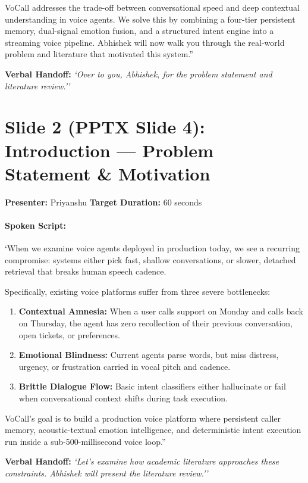 \documentclass[11pt,a4paper]{article}
\begin{document}
VoCall addresses the trade-off between conversational speed and deep contextual understanding in voice agents. We solve this by combining a four-tier persistent memory, dual-signal emotion fusion, and a structured intent engine into a streaming voice pipeline. Abhishek will now walk you through the real-world problem and literature that motivated this system.''

\noindent\textbf{Verbal Handoff:} \textit{`Over to you, Abhishek, for the problem statement and literature review.''}

\vspace{1.5em}

\section*{Slide 2 (PPTX Slide 4): Introduction — Problem Statement \& Motivation}
\textbf{Presenter:} Priyanshu \hfill \textbf{Target Duration:} 60 seconds

\paragraph{Spoken Script:}
`When we examine voice agents deployed in production today, we see a recurring compromise: systems either pick fast, shallow conversations, or slower, detached retrieval that breaks human speech cadence.

Specifically, existing voice platforms suffer from three severe bottlenecks:
\begin{enumerate}
    \item \textbf{Contextual Amnesia:} When a user calls support on Monday and calls back on Thursday, the agent has zero recollection of their previous conversation, open tickets, or preferences.
    \item \textbf{Emotional Blindness:} Current agents parse words, but miss distress, urgency, or frustration carried in vocal pitch and cadence.
    \item \textbf{Brittle Dialogue Flow:} Basic intent classifiers either hallucinate or fail when conversational context shifts during task execution.
\end{enumerate}
VoCall's goal is to build a production voice platform where persistent caller memory, acoustic-textual emotion intelligence, and deterministic intent execution run inside a sub-500-millisecond voice loop.''

\noindent\textbf{Verbal Handoff:} \textit{`Let's examine how academic literature approaches these constraints. Abhishek will present the literature review.''}
\end{document}

